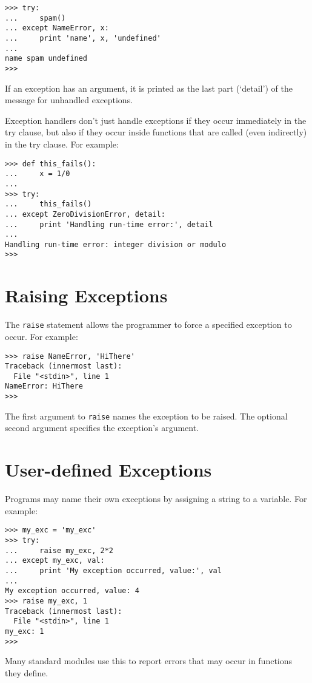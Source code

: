 \bcode\begin{verbatim}
>>> try:
...     spam()
... except NameError, x:
...     print 'name', x, 'undefined'
... 
name spam undefined
>>> 
\end{verbatim}\ecode
%
If an exception has an argument, it is printed as the last part
(`detail') of the message for unhandled exceptions.

Exception handlers don't just handle exceptions if they occur
immediately in the try clause, but also if they occur inside functions
that are called (even indirectly) in the try clause.
For example:

\bcode\begin{verbatim}
>>> def this_fails():
...     x = 1/0
... 
>>> try:
...     this_fails()
... except ZeroDivisionError, detail:
...     print 'Handling run-time error:', detail
... 
Handling run-time error: integer division or modulo
>>> 
\end{verbatim}\ecode

\section{Raising Exceptions}

The {\tt raise} statement allows the programmer to force a specified
exception to occur.
For example:

\bcode\begin{verbatim}
>>> raise NameError, 'HiThere'
Traceback (innermost last):
  File "<stdin>", line 1
NameError: HiThere
>>> 
\end{verbatim}\ecode
%
The first argument to {\tt raise} names the exception to be raised.
The optional second argument specifies the exception's argument.

\section{User-defined Exceptions}

Programs may name their own exceptions by assigning a string to a
variable.
For example:

\bcode\begin{verbatim}
>>> my_exc = 'my_exc'
>>> try:
...     raise my_exc, 2*2
... except my_exc, val:
...     print 'My exception occurred, value:', val
... 
My exception occurred, value: 4
>>> raise my_exc, 1
Traceback (innermost last):
  File "<stdin>", line 1
my_exc: 1
>>> 
\end{verbatim}\ecode
%
Many standard modules use this to report errors that may occur in
functions they define.

